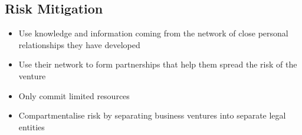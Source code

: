 \documentclass{article}[18pt]
\begin{document}
\subsection{Risk Mitigation}
\begin{itemize}
\item Use knowledge and information coming from the network of close personal relationships they have developed
\item Use their network to form partnerships that help them spread the risk of the venture
\item Only commit limited resources
\item Compartmentalise risk by separating business ventures into separate legal entities
\end{itemize}
\end{document}
